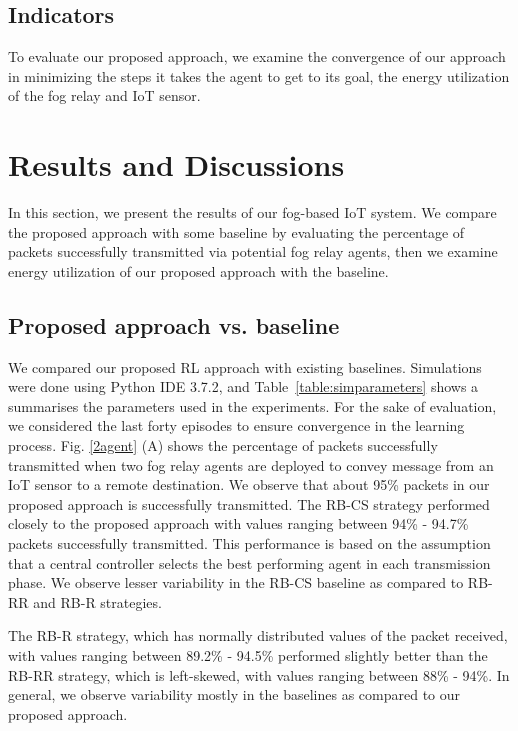 \documentclass[journal]{IEEEtran}
\begin{document}
\subsection{Indicators}
To evaluate our proposed approach, we examine the convergence of our approach in minimizing the steps it takes the agent to get to its goal, the energy utilization of the fog relay and IoT sensor.



\section{Results and Discussions}
In this section, we present the results of our fog-based IoT system. We compare the proposed approach with some baseline by evaluating the percentage of packets successfully transmitted via potential fog relay agents, then we examine energy utilization of our proposed approach with the baseline.

\subsection{Proposed approach vs. baseline}
We compared our proposed RL approach with existing baselines. Simulations were done using Python IDE 3.7.2, and Table~\ref{table:simparameters} shows a summarises the parameters used in the experiments. For the sake of evaluation, we considered the last forty episodes to ensure convergence in the learning process. Fig. \ref{2agent} (A) shows the percentage of packets successfully transmitted when two fog relay agents are deployed to convey message from an IoT sensor to a remote destination. We observe that about 95\% packets in our proposed approach is successfully transmitted. The RB-CS strategy performed closely to the proposed approach with values ranging between 94\% - 94.7\% packets successfully transmitted. This performance is based on the assumption that a central controller selects the best performing agent in each transmission phase. We observe lesser variability in the RB-CS baseline as compared to RB-RR and RB-R strategies.

The RB-R strategy, which has normally distributed values of the packet received, with values ranging between 89.2\% - 94.5\% performed slightly better than the RB-RR strategy, which is left-skewed, with values ranging between 88\% - 94\%. In general, we observe variability mostly in the baselines as compared to our proposed approach.
\end{document}
